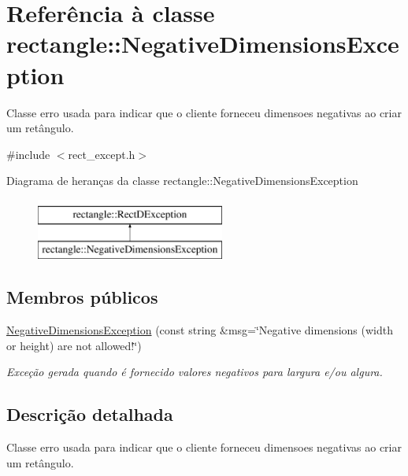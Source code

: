 \hypertarget{classrectangle_1_1NegativeDimensionsException}{\section{Referência à classe rectangle\-:\-:Negative\-Dimensions\-Exception}
\label{classrectangle_1_1NegativeDimensionsException}
}


Classe erro usada para indicar que o cliente forneceu dimensoes negativas ao criar um ret\^{a}ngulo.  




{\ttfamily \#include $<$rect\-\_\-except.\-h$>$}

Diagrama de heranças da classe rectangle\-:\-:Negative\-Dimensions\-Exception\begin{figure}[H]
\begin{center}
\leavevmode
\includegraphics[height=2.000000cm]{classrectangle_1_1NegativeDimensionsException}
\end{center}
\end{figure}
\subsection*{Membros públicos}
\begin{DoxyCompactItemize}
\item 
\hyperlink{classrectangle_1_1NegativeDimensionsException_a6192c9c93a330d0b83c0e9f4a4f416bf}{Negative\-Dimensions\-Exception} (const string \&msg=\char`\"{}Negative dimensions (width or height) are not allowed!\char`\"{})
\begin{DoxyCompactList}\small\item\em Exce\c{c}\~{a}o gerada quando é fornecido valores negativos para largura e/ou algura. \end{DoxyCompactList}\end{DoxyCompactItemize}


\subsection{Descrição detalhada}
Classe erro usada para indicar que o cliente forneceu dimensoes negativas ao criar um ret\^{a}ngulo. 

